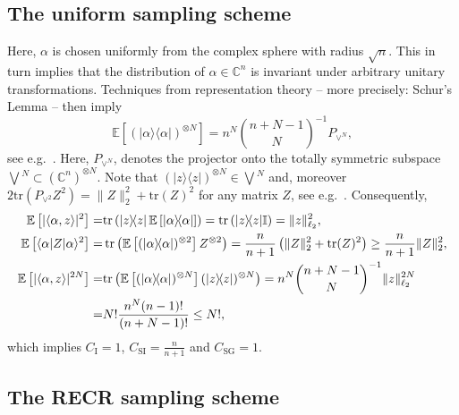 \subsection{The uniform sampling scheme}

Here, $\alpha$ is chosen uniformly from the complex sphere with radius $\sqrt{n}$.
This in turn implies that the distribution of $\alpha \in \mathbb{C}^n$ is invariant under arbitrary unitary transformations.
Techniques from representation theory -- more precisely: Schur's Lemma -- then imply
\[
  \label{eq:pl.from_schur}
  \mathbb{E} \left[ (|\alpha \rangle \! \langle \alpha| )^{\otimes N} \right] =
  n^N \binom{n+N-1}{N}^{-1}  P_{\vee^N},
\]
see e.g.\ \cite[Lemma~1]{Scott_2006_Tight}.
Here, $ P_{\vee^N}$, denotes the projector onto the totally symmetric subspace $\bigvee\!^N \subset \left( \mathbb{C}^n \right)^{\otimes N}$.
Note that $\left(| z \rangle \! \langle  z| \right)^{\otimes N} \in \bigvee\!^N$ and, moreover $2 \mathrm{tr} \left(  P_{\vee^2}  Z^2 \right)= \|  Z \|_2^2 + \mathrm{tr} ( Z)^2$ for any matrix $ Z$, see e.g.\ \cite[Lemma~17]{Kueng_2016_Low}.
Consequently,
\begin{align}
  \mathbb{E} \left[ | \langle\alpha, z \rangle|^2 \right]
  =& \mathrm{tr} \left( | z \rangle \! \langle  z| \, \mathbb{E} \left[ |\alpha \rangle \! \langle\alpha| \right] \right)
  = \mathrm{tr} \left( | z \rangle \! \langle  z| \mathbb{I} \right) = \|  z \|_{\ell_2}^2, \\
  \mathbb{E} \left[
  \langle\alpha| Z |\alpha \rangle^2 \right]
  =& \operatorname{tr} \left( \mathbb{E} \left[ (|\alpha \rangle \! \langle\alpha|)^{\otimes 2} \right]  Z^{\otimes 2} \right)
  = \frac{n}{n+1} \left( \|  Z \|_2^2 + \mathrm{tr}( Z)^2 \right) \geq \frac{n}{n+1} \|  Z \|_2^2, \\
  \mathbb{E} \left[ | \langle\alpha,  z \rangle |^{2N} \right]
  =& \mathrm{tr} \left(\mathbb{E} \left[ (|\alpha \rangle \! \langle\alpha|)^{\otimes N} \right]  (| z\rangle \! \langle  z|)^{\otimes N}  \right)
  = n^N \binom{n+N-1}{N}^{-1} \|  z \|_{\ell_2}^{2N} \\
  =& N! \frac{n^N (n-1)!}{(n+N-1)!} \leq N!,
\end{align}
which implies $C_\mathrm{I}=1$, $C_\mathrm{SI} = \frac{n}{n+1}$ and $C_\mathrm{SG}=1$.


\subsection{The RECR sampling scheme}

